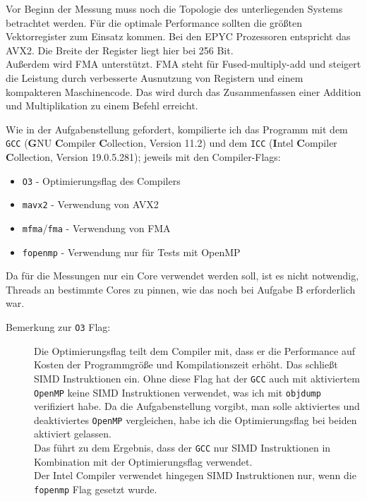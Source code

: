 \documentclass[german,plainarticle,hyperref,utf8]{zihpub}
\begin{document}
	Vor Beginn der Messung muss noch die Topologie des unterliegenden Systems betrachtet werden. Für die optimale Performance sollten die größten Vektorregister zum Einsatz kommen. Bei den EPYC Prozessoren entspricht das AVX2. Die Breite der Register liegt hier bei 256 Bit.\\
	Außerdem wird FMA unterstützt. FMA steht für Fused-multiply-add und steigert die Leistung durch verbesserte Ausnutzung von Registern und einem kompakteren Maschinencode. Das wird durch das Zusammenfassen einer Addition und Multiplikation zu einem Befehl erreicht.
	
	Wie in der Aufgabenstellung gefordert, kompilierte ich das Programm mit dem \texttt{GCC} (\textbf{G}NU \textbf{C}ompiler \textbf{C}ollection, Version 11.2) und dem \texttt{ICC} (\textbf{I}ntel \textbf{C}ompiler \textbf{C}ollection, Version 19.0.5.281); jeweils mit den Compiler-Flags:
	\begin{itemize}
		\item \texttt{O3} - Optimierungsflag des Compilers
		\item \texttt{mavx2} - Verwendung von AVX2
		\item \texttt{mfma}/\texttt{fma} - Verwendung von FMA
		\item \texttt{fopenmp} - Verwendung nur für Tests mit OpenMP
	\end{itemize}
	
	Da für die Messungen nur ein Core verwendet werden soll, ist es nicht notwendig, Threads an bestimmte Cores zu pinnen, wie das noch bei Aufgabe B erforderlich war.\\
	
	\begin{description}
		\item[Bemerkung zur \texttt{O3} Flag:] Die Optimierungsflag teilt dem Compiler mit, dass er die Performance auf Kosten der Programmgröße und Kompilationszeit erhöht. Das schließt SIMD Instruktionen ein. Ohne diese Flag hat der \texttt{GCC} auch mit aktiviertem \texttt{OpenMP} keine SIMD Instruktionen verwendet, was ich mit \texttt{objdump} verifiziert habe. Da die Aufgabenstellung vorgibt, man solle aktiviertes und deaktiviertes \texttt{OpenMP} vergleichen, habe ich die Optimierungsflag bei beiden aktiviert gelassen.\\
		Das führt zu dem Ergebnis, dass der \texttt{GCC} nur SIMD Instruktionen in Kombination mit der Optimierungsflag verwendet.\\
		Der Intel Compiler verwendet hingegen SIMD Instruktionen nur, wenn die \texttt{fopenmp} Flag gesetzt wurde.
	\end{description}
	\clearpage
\end{document}
